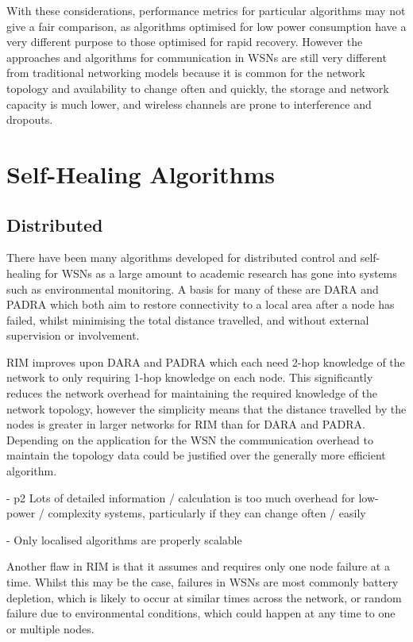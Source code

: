 \documentclass[authoryearcitations]{UoYCSproject}
\begin{document}
With these considerations, performance metrics for particular algorithms may not give a fair comparison, as algorithms optimised for low power consumption have a very different purpose to those optimised for rapid recovery. However the approaches and algorithms for communication in WSNs are still very different from traditional networking models because it is common for the network topology and availability to change often and quickly, the storage and network capacity is much lower, and wireless channels are prone to interference and dropouts.

\section{Self-Healing Algorithms}

\subsection{Distributed}

There have been many algorithms developed for distributed control and self-healing for WSNs as a large amount to academic research has gone into systems such as environmental monitoring. A basis for many of these are DARA \citep{Abbasi2007} and PADRA \citep{Akkaya2008} which both aim to restore connectivity to a local area after a node has failed, whilst minimising the total distance travelled, and without external supervision or involvement.

RIM \citep{Younis2010} improves upon DARA and PADRA which each need 2-hop knowledge of the network to only requiring 1-hop knowledge on each node. This significantly reduces the network overhead for maintaining the required knowledge of the network topology, however the simplicity means that the distance travelled by the nodes is greater in larger networks for RIM than for DARA and PADRA. Depending on the application for the WSN the communication overhead to maintain the topology data could be justified over the generally more efficient algorithm.

- p2 Lots of detailed information / calculation is too much overhead for low-power / complexity systems, particularly if they can change often / easily

- Only localised algorithms are properly scalable

Another flaw in RIM is that it assumes and requires only one node failure at a time. Whilst this may be the case, failures in WSNs are most commonly battery depletion, which is likely to occur at similar times across the network, or random failure due to environmental conditions, which could happen at any time to one or multiple nodes.
\end{document}
